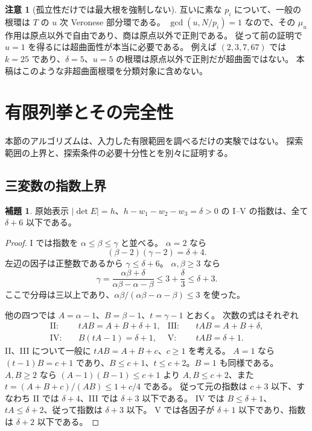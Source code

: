 \documentclass[11pt,a4paper]{ltjsarticle}
\numberwithin{equation}{section}
\theoremstyle{definition}
\newtheorem{lemma}[theorem]{補題}
\newtheorem{remark}[theorem]{注意}
\begin{document}
\begin{remark}[孤立性だけでは最大根を強制しない]
互いに素な $p_i$ について、一般の根環は $T$ の $u$ 次 Veronese 部分環である。
$\gcd(u,N/p_i)=1$ なので、その $\mu_u$ 作用は原点以外で自由であり、商は原点以外で正則である。
従って前の証明で $u=1$ を得るには超曲面性が本当に必要である。
例えば $(2,3,7,67)$ では $k=25$ であり、$\delta=5$、$u=5$ の根環は原点以外で正則だが超曲面ではない。
本稿はこのような非超曲面根環を分類対象に含めない。
\end{remark}

\section{有限列挙とその完全性}\label{sec:enumeration}
本節のアルゴリズムは、入力した有限範囲を調べるだけの実験ではない。
探索範囲の上界と、探索条件の必要十分性とを別々に証明する。

\subsection{三変数の指数上界}
\begin{lemma}\label{lem:exponentbound}
原始表示 $|\det E|=h$、$h-w_1-w_2-w_3=\delta>0$ の I--V の指数は、全て $\delta+6$ 以下である。
\end{lemma}
\begin{proof}
I では指数を $\alpha\le\beta\le\gamma$ と並べる。
$\alpha=2$ なら
\[
 (\beta-2)(\gamma-2)=\delta+4.
\]
左辺の因子は正整数であるから $\gamma\le\delta+6$。
$\alpha,\beta\ge3$ なら
\[
 \gamma=\frac{\alpha\beta+\delta}{\alpha\beta-\alpha-\beta}
 \le3+\frac\delta3\le\delta+3.
\]
ここで分母は三以上であり、$\alpha\beta/(\alpha\beta-\alpha-\beta)\le3$ を使った。

他の四つでは $A=\alpha-1$、$B=\beta-1$、$t=\gamma-1$ とおく。
次数の式はそれぞれ
\begin{align*}
 \mathrm{II}:&\quad tAB=A+B+\delta+1,&
 \mathrm{III}:&\quad tAB=A+B+\delta,\\
 \mathrm{IV}:&\quad B(tA-1)=\delta+1,&
 \mathrm{V}:&\quad tAB=\delta+1.
\end{align*}
II、III について一般に $tAB=A+B+c$、$c\ge1$ を考える。
$A=1$ なら $(t-1)B=c+1$ であり、$B\le c+1$、$t\le c+2$。$B=1$ も同様である。
$A,B\ge2$ なら $(A-1)(B-1)\le c+1$ より $A,B\le c+2$、また
$t=(A+B+c)/(AB)\le1+c/4$ である。
従って元の指数は $c+3$ 以下、すなわち II では $\delta+4$、III では $\delta+3$ 以下である。
IV では $B\le\delta+1$、$tA\le\delta+2$、従って指数は $\delta+3$ 以下。
V では各因子が $\delta+1$ 以下であり、指数は $\delta+2$ 以下である。
\end{proof}
\end{document}
